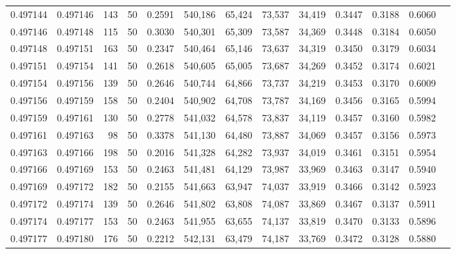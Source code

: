 \begin{tabular}{rrrrrrrrrrrrr}
0.497144 & 0.497146 &   143 &  50 &                                     0.2591 & 540,186 &  65,424 &  73,537 &  34,419 & 0.3447 & 0.3188 & 0.6060 \\
0.497146 & 0.497148 &   115 &  50 &                                     0.3030 & 540,301 &  65,309 &  73,587 &  34,369 & 0.3448 & 0.3184 & 0.6050 \\
0.497148 & 0.497151 &   163 &  50 &                                     0.2347 & 540,464 &  65,146 &  73,637 &  34,319 & 0.3450 & 0.3179 & 0.6034 \\
0.497151 & 0.497154 &   141 &  50 &                                     0.2618 & 540,605 &  65,005 &  73,687 &  34,269 & 0.3452 & 0.3174 & 0.6021 \\
0.497154 & 0.497156 &   139 &  50 &                                     0.2646 & 540,744 &  64,866 &  73,737 &  34,219 & 0.3453 & 0.3170 & 0.6009 \\
0.497156 & 0.497159 &   158 &  50 &                                     0.2404 & 540,902 &  64,708 &  73,787 &  34,169 & 0.3456 & 0.3165 & 0.5994 \\
0.497159 & 0.497161 &   130 &  50 &                                     0.2778 & 541,032 &  64,578 &  73,837 &  34,119 & 0.3457 & 0.3160 & 0.5982 \\
0.497161 & 0.497163 &    98 &  50 &                                     0.3378 & 541,130 &  64,480 &  73,887 &  34,069 & 0.3457 & 0.3156 & 0.5973 \\
0.497163 & 0.497166 &   198 &  50 &                                     0.2016 & 541,328 &  64,282 &  73,937 &  34,019 & 0.3461 & 0.3151 & 0.5954 \\
0.497166 & 0.497169 &   153 &  50 &                                     0.2463 & 541,481 &  64,129 &  73,987 &  33,969 & 0.3463 & 0.3147 & 0.5940 \\
0.497169 & 0.497172 &   182 &  50 &                                     0.2155 & 541,663 &  63,947 &  74,037 &  33,919 & 0.3466 & 0.3142 & 0.5923 \\
0.497172 & 0.497174 &   139 &  50 &                                     0.2646 & 541,802 &  63,808 &  74,087 &  33,869 & 0.3467 & 0.3137 & 0.5911 \\
0.497174 & 0.497177 &   153 &  50 &                                     0.2463 & 541,955 &  63,655 &  74,137 &  33,819 & 0.3470 & 0.3133 & 0.5896 \\
0.497177 & 0.497180 &   176 &  50 &                                     0.2212 & 542,131 &  63,479 &  74,187 &  33,769 & 0.3472 & 0.3128 & 0.5880 \\

\end{tabular}
